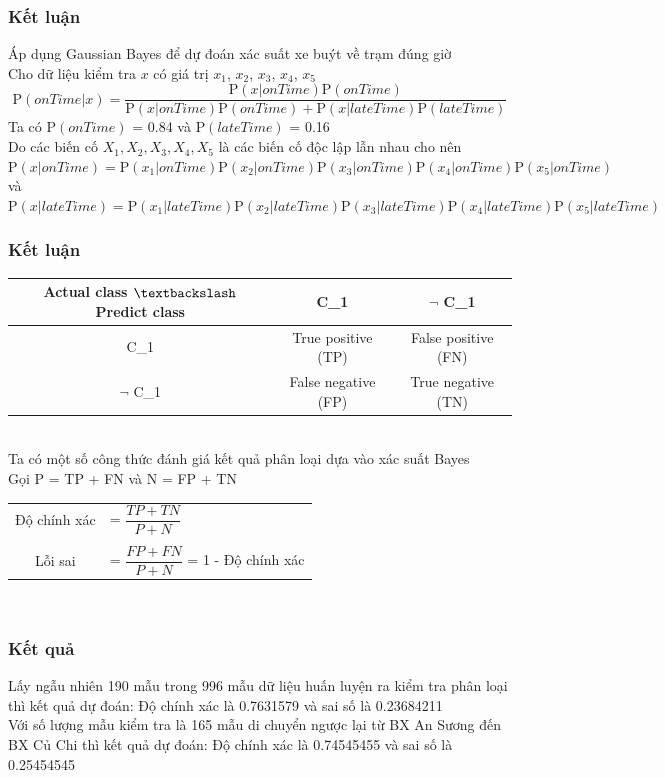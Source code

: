 \documentclass[t]{beamer}
\begin{document}
\begin{frame}
\frametitle{Kết luận}
Áp dụng Gaussian Bayes để dự đoán xác suất xe buýt về trạm đúng giờ\\
Cho dữ liệu kiểm tra $x$ có giá trị $x_1$, $x_2$, $x_3$, $x_4$, $x_5$\\
\[
\mathrm{P}(onTime|x) = \frac{\mathrm{P}(x|onTime)\mathrm{P}(onTime)}{\mathrm{P}(x|onTime)\mathrm{P}(onTime)+\mathrm{P}(x|lateTime)\mathrm{P}(lateTime)}
\]
Ta có $\mathrm{P}(onTime)$ = 0.84 và $\mathrm{P}(lateTime)$ = 0.16\\
Do các biến cố $X_1, X_2, X_3, X_4, X_5$ là các biến cố độc lập lẫn nhau cho nên\\
$\mathrm{P}(x|onTime) = \mathrm{P}(x_1|onTime)\mathrm{P}(x_2|onTime)\mathrm{P}(x_3|onTime)\mathrm{P}(x_4|onTime)\mathrm{P}(x_5|onTime)$ \\
và $\mathrm{P}(x|lateTime) = \mathrm{P}(x_1|lateTime)\mathrm{P}(x_2|lateTime)\mathrm{P}(x_3|lateTime)\mathrm{P}(x_4|lateTime)\mathrm{P}(x_5|lateTime)$
\end{frame}

\begin{frame}
\frametitle{Kết luận}
\begin{tabular}{ |c|c|c| }
\hline
Actual class $\textbackslash$ Predict class & C\_1 & $\neg$ C\_1 \\
\hline
C\_1 & True positive (TP) & False positive (FN)\\
\hline
$\neg$ C\_1 & False negative (FP) & True negative (TN)\\
\hline
\end{tabular}\\
Ta có một số công thức đánh giá kết quả phân loại dựa vào xác suất Bayes\\
Gọi P = TP + FN và N = FP + TN\\
\center
\begin{tabular}{ cl }
Độ chính xác & = $\dfrac{TP+TN}{P+N}$ \\
& \\
Lỗi sai & = $\dfrac{FP+FN}{P+N}$ = 1 - Độ chính xác\\
\end{tabular}\\
\end{frame}


\begin{frame}
\frametitle{Kết quả}
Lấy ngẫu nhiên 190 mẫu trong 996 mẫu dữ liệu huấn luyện ra kiểm tra phân loại thì kết quả dự đoán: Độ chính xác là 0.7631579 và sai số là 0.23684211\\
Với số lượng mẫu kiểm tra là 165 mẫu di chuyển ngược lại từ BX An Sương đến BX Củ Chi thì kết quả dự đoán: Độ chính xác là 0.74545455 và sai số là 0.25454545\\
\end{frame}
\end{document}
